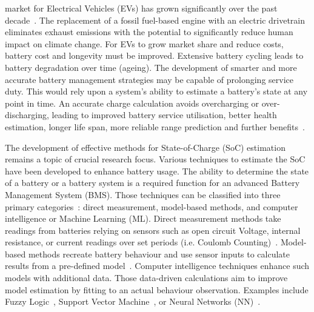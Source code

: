  {
     market for Electrical Vehicles (EVs) has grown significantly over the past decade~\cite{state-ev-australia}.
    The replacement of a fossil fuel-based engine with an electric drivetrain eliminates exhaust emissions with the potential to significantly reduce human impact on climate change.
    For EVs to grow market share and reduce costs, battery cost and longevity must be improved.
    Extensive battery cycling leads to battery degradation over time (ageing).
    The development of smarter and more accurate battery management strategies may be capable of prolonging service duty.
    This would rely upon a system's ability to estimate a battery's state at any point in time.
    An accurate charge calculation avoids overcharging or over-discharging, leading to improved battery service utilisation, better health estimation, longer life span, more reliable range prediction and further benefits~\cite{calif_proper_2008}.
}

%
The development of effective methods for State-of-Charge (SoC) estimation remains a topic of crucial research focus.
Various techniques to estimate the SoC have been developed to enhance battery usage.
The ability to determine the state of a battery or a battery system is a required function for an advanced Battery Management System (BMS).
Those techniques can be classified into three primary categories~\cite{ali_towards_2019,ng_enhanced_2009,robust_SoC,6953745}: direct measurement, model-based methods, and computer intelligence or Machine Learning (ML).
Direct measurement methods take readings from batteries relying on sensors such as open circuit Voltage, internal resistance, or current readings over set periods (i.e. Coulomb Counting)~\cite{ng_enhanced_2009,robust_SoC}.
Model-based methods recreate battery behaviour and use sensor inputs to calculate results from a pre-defined model~\cite{6953745}.
Computer intelligence techniques enhance such models with additional data.
Those data-driven calculations aim to improve model estimation by fitting to an actual behaviour observation.
Examples include Fuzzy Logic~\cite{malkhandi_fuzzy_2006}, Support Vector Machine~\cite{hansen_support_2005, anton_battery_2013}, or Neural Networks (NN)~\cite{song_lithium-ion_2018,Chemali2017,mamo_long_2020,jiao_gru-rnn_2020,xiao_accurate_2019,javid_adaptive_2020,zhang_deep_2020}.

